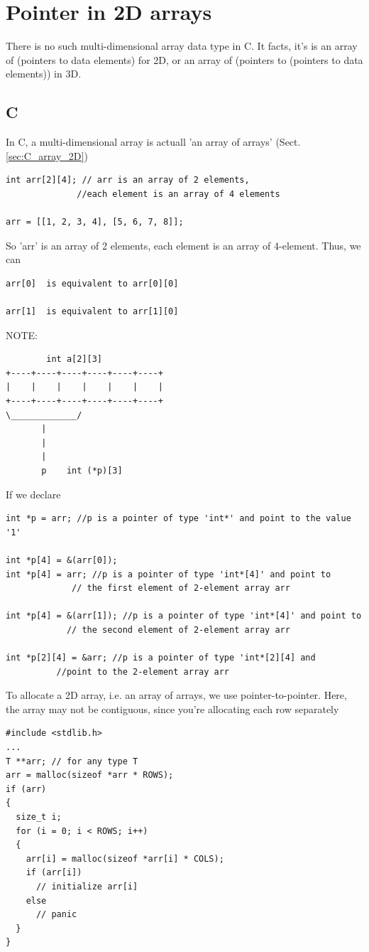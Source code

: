 \section{Pointer in 2D arrays}
\label{sec:pointer-2Darrays}

There is no such multi-dimensional array data type in C. It facts, it's is an
array of (pointers to data elements) for 2D, or an array of (pointers to
(pointers to data elements)) in 3D.

\subsection{C}


In C, a multi-dimensional array is actuall 'an array of arrays'
(Sect.\ref{sec:C_array_2D}) 
\begin{lstlisting}
int arr[2][4]; // arr is an array of 2 elements, 
              //each element is an array of 4 elements

arr = [[1, 2, 3, 4], [5, 6, 7, 8]];
\end{lstlisting}
So 'arr' is an array of 2 elements, each element is an array of 4-element. Thus,
we can 
\begin{verbatim}
arr[0]  is equivalent to arr[0][0]

arr[1]  is equivalent to arr[1][0]
\end{verbatim}

NOTE:
\begin{verbatim}
        int a[2][3]
+----+----+----+----+----+----+
|    |    |    |    |    |    |
+----+----+----+----+----+----+
\_____________/
       |
       |    
       |
       p    int (*p)[3]
\end{verbatim}

If we declare
\begin{lstlisting}
int *p = arr; //p is a pointer of type 'int*' and point to the value '1'

int *p[4] = &(arr[0]);
int *p[4] = arr; //p is a pointer of type 'int*[4]' and point to
             // the first element of 2-element array arr
             
int *p[4] = &(arr[1]); //p is a pointer of type 'int*[4]' and point to
            // the second element of 2-element array arr             
            
int *p[2][4] = &arr; //p is a pointer of type 'int*[2][4] and 
          //point to the 2-element array arr            
\end{lstlisting}

To allocate a 2D array, i.e. an array of arrays, we use pointer-to-pointer.
Here, the array may not be contiguous, since you're allocating each row
separately
\begin{lstlisting}
#include <stdlib.h>
...
T **arr; // for any type T
arr = malloc(sizeof *arr * ROWS);
if (arr)
{
  size_t i;
  for (i = 0; i < ROWS; i++)
  {
    arr[i] = malloc(sizeof *arr[i] * COLS);
    if (arr[i])
      // initialize arr[i]
    else
      // panic
  }
}
\end{lstlisting}

